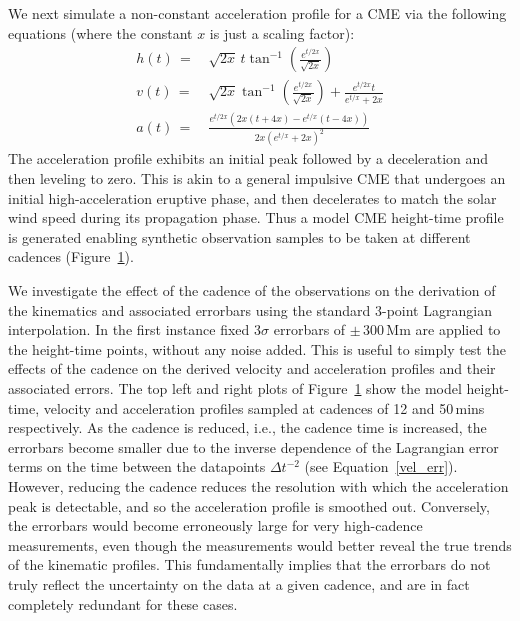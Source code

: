\documentclass[structabstract]{aa}
\begin{document}
\begin{figure}
\caption{}
\label{fig_cadence_hva}
\end{figure}


We next simulate a non-constant acceleration profile for a CME via the following equations (where the constant $x$ is just a scaling factor):
\begin{eqnarray}
h(t)\,=&\,\sqrt{2x}\,t\tan^{-1}\left(\frac{e^{t/2x}}{\sqrt{2x}}\right) \\
v(t)\,=&\,\sqrt{2x}\tan^{-1}\left(\frac{e^{t/2x}}{\sqrt{2x}}\right)+\frac{e^{t/2x}t}{e^{t/x}+2x} \\
a(t)\,=&\,\frac{e^{t/2x}\left(2x\left(t+4x\right)-e^{t/x}\left(t-4x\right)\right)}{2x\left(e^{t/x}+2x\right)^2}
\label{eqn:nonconst_a}
\end{eqnarray}
The acceleration profile exhibits an initial peak followed by a deceleration and then leveling to zero. This is akin to a general impulsive CME that undergoes an initial high-acceleration eruptive phase, and then decelerates to match the solar wind speed during its propagation phase. Thus a model CME height-time profile is generated enabling synthetic observation samples to be taken at different cadences (Figure~\ref{fig_cadence_hva}). 

We investigate the effect of the cadence of the observations on the derivation of the kinematics and associated errorbars using the standard 3-point Lagrangian interpolation. In the first instance fixed 3$\sigma$ errorbars of $\pm$\,300\,Mm are applied to the height-time points, without any noise added. This is useful to simply test the effects of the cadence on the derived velocity and acceleration profiles and their associated errors. The top left and right plots of Figure~\ref{fig_cadence_hva} show the model height-time, velocity and acceleration profiles sampled at cadences of 12 and 50\,mins respectively. As the cadence is reduced, i.e., the cadence time is increased, the errorbars become smaller due to the inverse dependence of the Lagrangian error terms on the time between the datapoints $\Delta t^{-2}$ (see Equation~\ref{vel_err}). However, reducing the cadence reduces the resolution with which the acceleration peak is detectable, and so the acceleration profile is smoothed out. Conversely, the errorbars would become erroneously large for very high-cadence measurements, even though the measurements would better reveal the true trends of the kinematic profiles. This fundamentally implies that the errorbars do not truly reflect the uncertainty on the data at a given cadence, and are in fact completely redundant for these cases.
\end{document}
